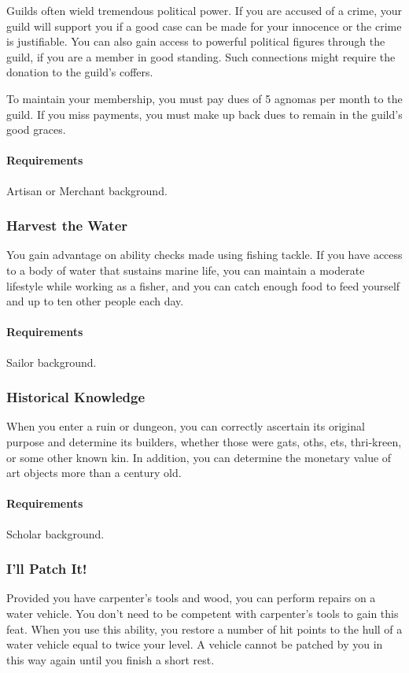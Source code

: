     Guilds often wield tremendous political power.
    If you are accused of a crime, your guild will support you if a good case can be made for your innocence or the crime is justifiable.
    You can also gain access to powerful political figures through the guild, if you are a member in good standing.
    Such connections might require the donation to the guild's coffers.

    To maintain your membership, you must pay dues of 5 agnomas per month to the guild.
    If you miss payments, you must make up back dues to remain in the guild's good graces.
    \paragraph{Requirements} Artisan or Merchant background.
\subsubsection{Harvest the Water} \label{feat::harvestthewater}
    You gain advantage on ability checks made using fishing tackle.
    If you have access to a body of water that sustains marine life, you can maintain a moderate lifestyle while working as a fisher, and you can catch enough food to feed yourself and up to ten other people each day.
    \paragraph{Requirements} Sailor background.
\subsubsection{Historical Knowledge} \label{feat::historicalknowledge}
    When you enter a ruin or dungeon, you can correctly ascertain its original purpose and determine its builders, whether those were gats, oths, ets, thri-kreen, or some other known kin.
    In addition, you can determine the monetary value of art objects more than a century old.
    \paragraph{Requirements} Scholar background.
\subsubsection{I'll Patch It!} \label{feat::illpatchit}
    Provided you have carpenter's tools and wood, you can perform repairs on a water vehicle.
    You don't need to be competent with carpenter's tools to gain this feat.
    When you use this ability, you restore a number of hit points to the hull of a water vehicle equal to twice your level.
    A vehicle cannot be patched by you in this way again until you finish a short rest.
